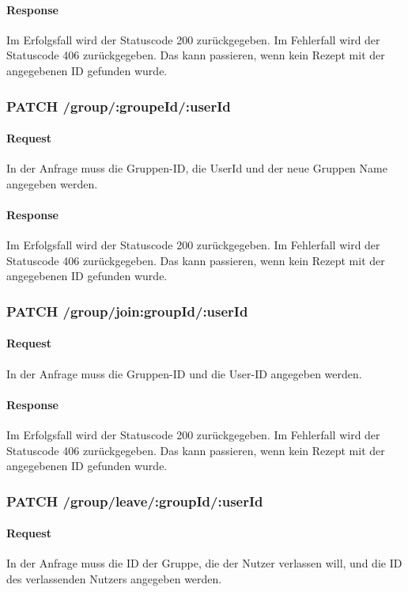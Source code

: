 \documentclass{entwurfsheft}
\begin{document}
\begin{sloppypar}
    \paragraph{Response}
        Im Erfolgsfall wird der Statuscode 200 zurückgegeben. Im Fehlerfall wird der Statuscode 406 zurückgegeben. Das kann passieren, wenn kein Rezept mit der angegebenen ID gefunden wurde.
        
\subsubsection*{PATCH /group/:groupeId/:userId}
    \paragraph{Request}
        In der Anfrage muss die Gruppen-ID, die UserId und der neue Gruppen Name angegeben werden.
    \paragraph{Response}
        Im Erfolgsfall wird der Statuscode 200 zurückgegeben.
        Im Fehlerfall wird der Statuscode 406 zurückgegeben. Das kann passieren, wenn kein Rezept mit der angegebenen ID gefunden wurde.
        
\subsubsection*{PATCH /group/join:groupId/:userId}
    \paragraph{Request}
        In der Anfrage muss die Gruppen-ID und die User-ID angegeben werden.
    \paragraph{Response}
        Im Erfolgsfall wird der Statuscode 200 zurückgegeben.
        Im Fehlerfall wird der Statuscode 406 zurückgegeben. Das kann passieren, wenn kein Rezept mit der angegebenen ID gefunden wurde.
        
\subsubsection*{PATCH /group/leave/:groupId/:userId}
    \paragraph{Request}
        In der Anfrage muss die ID der Gruppe, die der Nutzer verlassen will, und die ID des verlassenden Nutzers angegeben werden.

\end{sloppypar}
\end{document}
